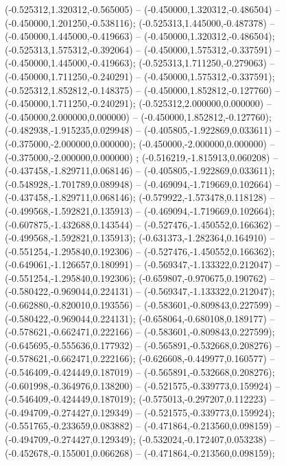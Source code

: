  (-0.525312,1.320312,-0.565005) -- (-0.450000,1.320312,-0.486504) -- (-0.450000,1.201250,-0.538116);
 (-0.525313,1.445000,-0.487378) -- (-0.450000,1.445000,-0.419663) -- (-0.450000,1.320312,-0.486504);
 (-0.525313,1.575312,-0.392064) -- (-0.450000,1.575312,-0.337591) -- (-0.450000,1.445000,-0.419663);
 (-0.525313,1.711250,-0.279063) -- (-0.450000,1.711250,-0.240291) -- (-0.450000,1.575312,-0.337591);
 (-0.525312,1.852812,-0.148375) -- (-0.450000,1.852812,-0.127760) -- (-0.450000,1.711250,-0.240291);
 (-0.525312,2.000000,0.000000) -- (-0.450000,2.000000,0.000000) -- (-0.450000,1.852812,-0.127760);
 (-0.482938,-1.915235,0.029948) -- (-0.405805,-1.922869,0.033611) -- (-0.375000,-2.000000,0.000000);
 (-0.450000,-2.000000,0.000000) -- (-0.375000,-2.000000,0.000000) ;
 (-0.516219,-1.815913,0.060208) -- (-0.437458,-1.829711,0.068146) -- (-0.405805,-1.922869,0.033611);
 (-0.548928,-1.701789,0.089948) -- (-0.469094,-1.719669,0.102664) -- (-0.437458,-1.829711,0.068146);
 (-0.579922,-1.573478,0.118128) -- (-0.499568,-1.592821,0.135913) -- (-0.469094,-1.719669,0.102664);
 (-0.607875,-1.432688,0.143544) -- (-0.527476,-1.450552,0.166362) -- (-0.499568,-1.592821,0.135913);
 (-0.631373,-1.282364,0.164910) -- (-0.551254,-1.295840,0.192306) -- (-0.527476,-1.450552,0.166362);
 (-0.649061,-1.126657,0.180991) -- (-0.569347,-1.133322,0.212047) -- (-0.551254,-1.295840,0.192306);
 (-0.659807,-0.970675,0.190762) -- (-0.580422,-0.969044,0.224131) -- (-0.569347,-1.133322,0.212047);
 (-0.662880,-0.820010,0.193556) -- (-0.583601,-0.809843,0.227599) -- (-0.580422,-0.969044,0.224131);
 (-0.658064,-0.680108,0.189177) -- (-0.578621,-0.662471,0.222166) -- (-0.583601,-0.809843,0.227599);
 (-0.645695,-0.555636,0.177932) -- (-0.565891,-0.532668,0.208276) -- (-0.578621,-0.662471,0.222166);
 (-0.626608,-0.449977,0.160577) -- (-0.546409,-0.424449,0.187019) -- (-0.565891,-0.532668,0.208276);
 (-0.601998,-0.364976,0.138200) -- (-0.521575,-0.339773,0.159924) -- (-0.546409,-0.424449,0.187019);
 (-0.575013,-0.297207,0.112223) -- (-0.494709,-0.274427,0.129349) -- (-0.521575,-0.339773,0.159924);
 (-0.551765,-0.233659,0.083882) -- (-0.471864,-0.213560,0.098159) -- (-0.494709,-0.274427,0.129349);
 (-0.532024,-0.172407,0.053238) -- (-0.452678,-0.155001,0.066268) -- (-0.471864,-0.213560,0.098159);
